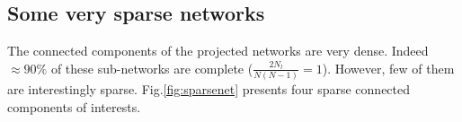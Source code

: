 \documentclass[10pt,a4paper]{article}
\begin{document}
\clearpage
\subsection{Some very sparse networks}
The connected components of the projected networks are very dense. Indeed $\approx 90\%$ of these sub-networks are complete ($\frac{2N_{l}}{N(N-1)} = 1$). However, few of them are interestingly sparse. Fig.\ref{fig:sparsenet} presents four sparse connected components of interests.
\end{document}
